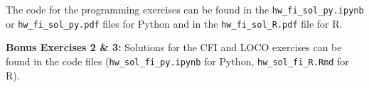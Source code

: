 \documentclass[a4paper]{article}
\begin{document}

The code for the programming exercises can be found in the \texttt{hw\_fi\_sol\_py.ipynb} or \texttt{hw\_fi\_sol\_py.pdf} files for Python and in the \texttt{hw\_fi\_sol\_R.pdf} file for R.



\dlz

\textbf{Bonus Exercises 2 \& 3:} Solutions for the CFI and LOCO exercises can be found in the code files (\texttt{hw\_sol\_fi\_py.ipynb} for Python, \texttt{hw\_sol\_fi\_R.Rmd} for R).
\end{document}
